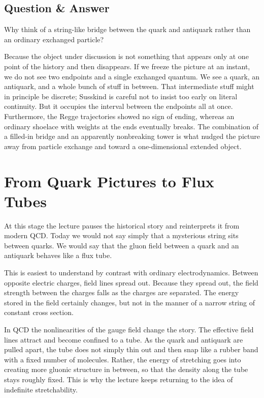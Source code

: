 \subsection{Question \& Answer}

Why think of a string-like bridge between the quark and antiquark rather than an ordinary exchanged particle?

Because the object under discussion is not something that appears only at one point of the history and then disappears. If we freeze the picture at an instant, we do not see two endpoints and a single exchanged quantum. We see a quark, an antiquark, and a whole bunch of stuff in between. That intermediate stuff might in principle be discrete; Susskind is careful not to insist too early on literal continuity. But it occupies the interval between the endpoints all at once. Furthermore, the Regge trajectories showed no sign of ending, whereas an ordinary shoelace with weights at the ends eventually breaks. The combination of a filled-in bridge and an apparently nonbreaking tower is what nudged the picture away from particle exchange and toward a one-dimensional extended object.

\section{From Quark Pictures to Flux Tubes}

At this stage the lecture pauses the historical story and reinterprets it from modern QCD. Today we would not say simply that a mysterious string sits between quarks. We would say that the gluon field between a quark and an antiquark behaves like a flux tube.

This is easiest to understand by contrast with ordinary electrodynamics. Between opposite electric charges, field lines spread out. Because they spread out, the field strength between the charges falls as the charges are separated. The energy stored in the field certainly changes, but not in the manner of a narrow string of constant cross section.

In QCD the nonlinearities of the gauge field change the story. The effective field lines attract and become confined to a tube. As the quark and antiquark are pulled apart, the tube does not simply thin out and then snap like a rubber band with a fixed number of molecules. Rather, the energy of stretching goes into creating more gluonic structure in between, so that the density along the tube stays roughly fixed. This is why the lecture keeps returning to the idea of indefinite stretchability.

